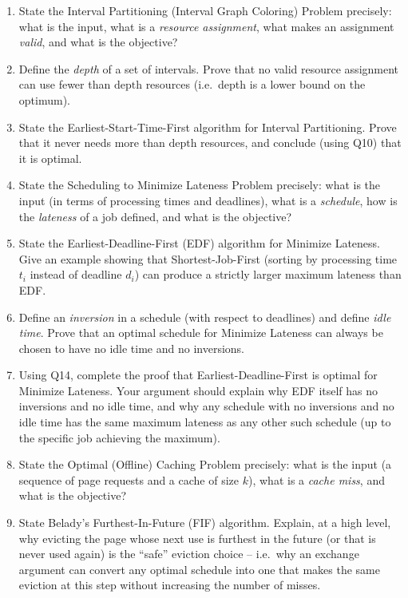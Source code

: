 \documentclass[11pt]{article}
\begin{document}
\begin{enumerate}[label=\textbf{A\arabic*.}, leftmargin=2.2em]
\item State the Interval Partitioning (Interval Graph Coloring) Problem precisely: what is
the input, what is a \emph{resource assignment}, what makes an assignment \emph{valid},
and what is the objective?

\item Define the \emph{depth} of a set of intervals. Prove that no valid resource
assignment can use fewer than $\mathrm{depth}$ resources (i.e.\ depth is a lower bound on
the optimum).

\item State the Earliest-Start-Time-First algorithm for Interval Partitioning. Prove that
it never needs more than $\mathrm{depth}$ resources, and conclude (using Q10) that it is
optimal.

\item State the Scheduling to Minimize Lateness Problem precisely: what is the input (in
terms of processing times and deadlines), what is a \emph{schedule}, how is the
\emph{lateness} of a job defined, and what is the objective?

\item State the Earliest-Deadline-First (EDF) algorithm for Minimize Lateness. Give an
example showing that Shortest-Job-First (sorting by processing time $t_i$ instead of
deadline $d_i$) can produce a strictly larger maximum lateness than EDF.

\item Define an \emph{inversion} in a schedule (with respect to deadlines) and define
\emph{idle time}. Prove that an optimal schedule for Minimize Lateness can always be
chosen to have no idle time and no inversions.

\item Using Q14, complete the proof that Earliest-Deadline-First is optimal for Minimize
Lateness. Your argument should explain why EDF itself has no inversions and no idle time,
and why any schedule with no inversions and no idle time has the same maximum lateness as
any other such schedule (up to the specific job achieving the maximum).

\item State the Optimal (Offline) Caching Problem precisely: what is the input (a sequence
of page requests and a cache of size $k$), what is a \emph{cache miss}, and what is the
objective?

\item State Belady's Furthest-In-Future (FIF) algorithm. Explain, at a high level, why
evicting the page whose next use is furthest in the future (or that is never used again)
is the ``safe'' eviction choice -- i.e.\ why an exchange argument can convert any optimal
schedule into one that makes the same eviction at this step without increasing the number
of misses.


\end{enumerate}
\end{document}
